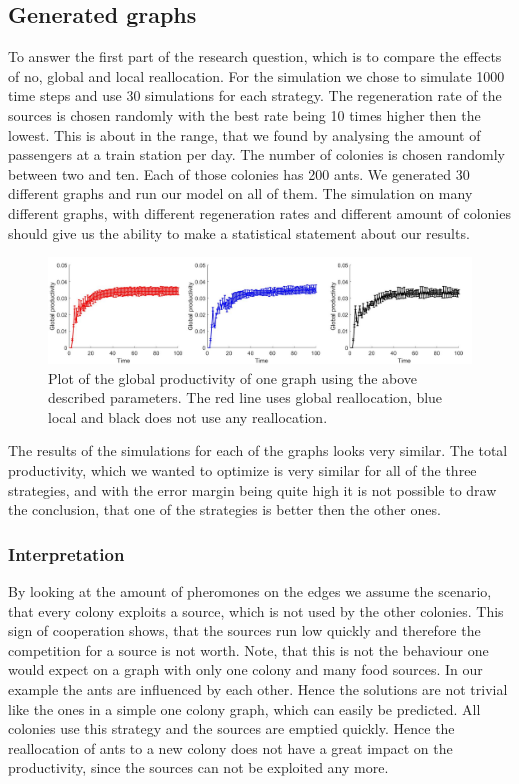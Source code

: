 \subsection{Generated graphs} \label{results1}
To answer the first part of the research question, which is to compare the effects of no, global and local reallocation. For the simulation we chose to simulate 1000 time steps and use 30 simulations for each strategy. The regeneration rate of the sources is chosen randomly with the best rate being 10 times higher then the lowest. This is about in the range, that we found by analysing the amount of passengers at a train station per day. The number of colonies is chosen randomly between two and ten. Each of those colonies has 200 ants. We generated 30 different graphs and run our model on all of them. The simulation on many different graphs, with different regeneration rates and different amount of colonies should give us the ability to make a statistical statement about our results.

\begin{figure}[H]
	\centering
	\includegraphics[scale=0.5]{globalProductivity.pdf}
	\caption{Plot of the global productivity of one graph using the above described parameters. The red line uses global reallocation, blue local and black does not use any reallocation.}
\end{figure}
The results of the simulations for each of the graphs looks very similar. The total productivity, which we wanted to optimize is very similar for all of the three strategies, and with the error margin being quite high it is not possible to draw the conclusion, that one of the strategies is better then the other ones. 
\subsubsection{Interpretation}
By looking at the amount of pheromones on the edges we assume the scenario, that every colony exploits a source, which is not used by the other colonies. This sign of cooperation shows, that the sources run low quickly and therefore the competition for a source is not worth. Note, that this is not the behaviour one would expect on a graph with only one colony and many food sources. In our example the ants are influenced by each other. Hence the solutions are not trivial like the ones in a simple one colony graph, which can easily be predicted. All colonies use this strategy and the sources are emptied quickly. Hence the reallocation of ants to a new colony does not have a great impact on the productivity, since the sources can not be exploited any more.

